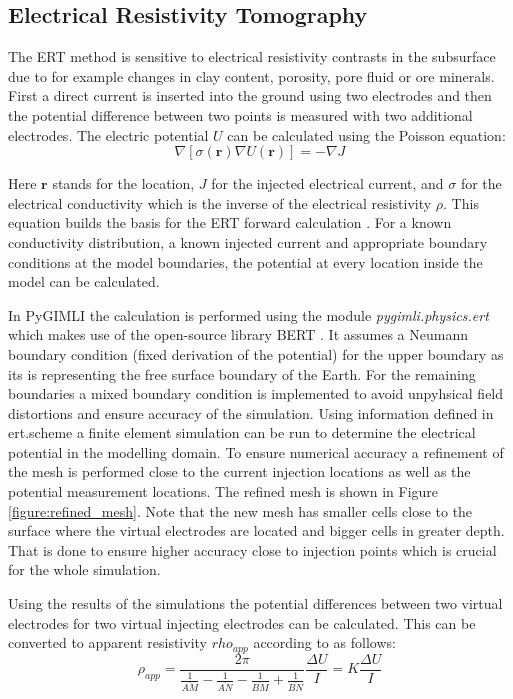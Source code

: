 \subsection{Electrical Resistivity Tomography}\label{section:ERT}
The ERT method is sensitive to electrical resistivity contrasts in the subsurface due to for example changes in clay content, porosity, pore fluid or ore minerals. First a direct current is inserted into the ground using two electrodes and then the potential difference between two points is measured with two additional electrodes. The electric potential $U$ can be calculated using the Poisson equation: 
\begin{equation}
    \nabla[\sigma (\textbf{r}) \nabla U(\textbf{r})] = -\nabla J
    \label{Eq:poisson}
\end{equation}

Here $\textbf{r}$ stands for the location, $J$ for the injected electrical current, and $\sigma$ for the electrical conductivity which is the inverse of the electrical resistivity $\rho$. This equation builds the basis for the ERT forward calculation \citep{johnson2015accurate}. For a known conductivity distribution, a known injected current and appropriate boundary conditions at the model boundaries, the potential at every location inside the model can be calculated. 

In PyGIMLI the calculation is performed using the module \textit{pygimli.physics.ert} which makes use of the open-source library BERT \citep{gunther20063, rucker20063}. It assumes a Neumann boundary condition (fixed derivation of the potential) for the upper boundary as its is representing the free surface boundary of the Earth. For the remaining boundaries a mixed boundary condition is implemented to avoid unpyhsical field distortions and ensure accuracy of the simulation. 
Using information defined in ert.scheme a finite element simulation can be run to determine the electrical potential in the modelling domain. To ensure numerical accuracy a refinement of the mesh is performed close to the current injection locations as well as the potential measurement locations. The refined mesh is shown in Figure \ref{figure:refined_mesh}. Note that the new mesh has smaller cells close to the surface where the virtual electrodes are located and bigger cells in greater depth. That is done to ensure higher accuracy close to injection points which is crucial for the whole simulation.

Using the results of the simulations the potential differences between two virtual electrodes for two virtual injecting electrodes can be calculated. This can be converted to apparent resistivity $rho_{app}$ according to \citet{kearey2002introduction} as follows:
\begin{equation}
    \rho_{app} = \frac{2\pi}{\frac{1}{\overline{AM}}-\frac{1}{\overline{AN}}-\frac{1}{\overline{BM}}+\frac{1}{\overline{BN}}} \frac{\Delta U}{I} = K \frac{\Delta U}{I}
    \label{Eq:rho_app}
\end{equation}

